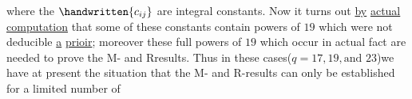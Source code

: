 where the  $\handwritten{c_{ij}}$ are integral constants. Now it turns out \uline{by} \uline{actual} \uline{computation} that some of these constants contain powers of $19$ which were not deducible \uline{a} \uline{prio\mbox{ir}}; moreover these full powers of $19$ which occur in actual fact are needed to prove the M- and R\normalmarginpar{}results. Thus in these cases(\uline{$q$}$=17,19,\text{and }23$)we have at present the situation that the M- and R-results can only be established for a limited number of
